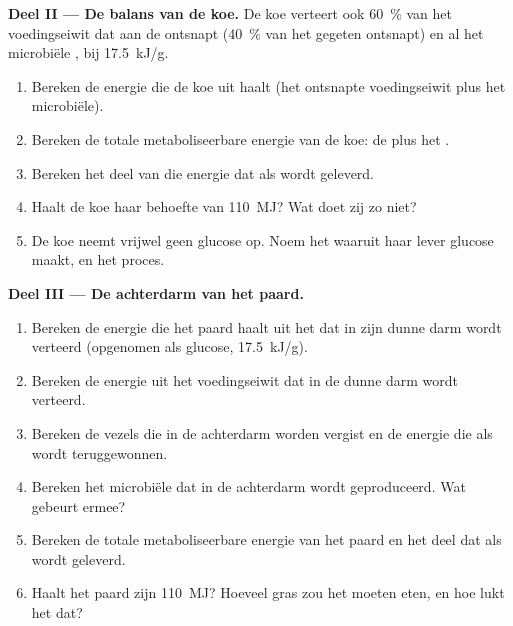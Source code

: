 \begin{problem}
\medskip
\noindent\textbf{Deel II --- De balans van de koe.}
De koe verteert ook \qty{60}{\%} van het voedingseiwit dat aan de 
ontsnapt (\qty{40}{\%} van het gegeten  ontsnapt) en al het
microbiële , bij \qty{17.5}{kJ/g}.
\begin{enumerate}[resume]
  \item Bereken de energie die de koe uit  haalt (het ontsnapte
        voedingseiwit plus het microbiële).
  \item Bereken de totale metaboliseerbare energie van de koe: de
         plus het .
  \item Bereken het deel van die energie dat als 
        wordt geleverd.
  \item Haalt de koe haar behoefte van \qty{110}{MJ}? Wat doet zij zo
        niet?
  \item De koe neemt vrijwel geen glucose op. Noem het  waaruit
        haar lever glucose maakt, en het proces.
\end{enumerate}

\medskip
\noindent\textbf{Deel III --- De achterdarm van het paard.}
\begin{enumerate}[resume]
  \item Bereken de energie die het paard haalt uit het  dat in
        zijn dunne darm wordt verteerd (opgenomen als glucose,
        \qty{17.5}{kJ/g}).
  \item Bereken de energie uit het voedingseiwit dat in de dunne darm
        wordt verteerd.
  \item Bereken de vezels die in de achterdarm worden vergist en de
        energie die als  wordt teruggewonnen.
  \item Bereken het microbiële  dat in de achterdarm wordt
        geproduceerd. Wat gebeurt ermee?
  \item Bereken de totale metaboliseerbare energie van het paard en het
        deel dat als  wordt geleverd.
  \item Haalt het paard zijn \qty{110}{MJ}? Hoeveel gras zou het moeten
        eten, en hoe lukt het dat?
\end{enumerate}


\end{problem}
